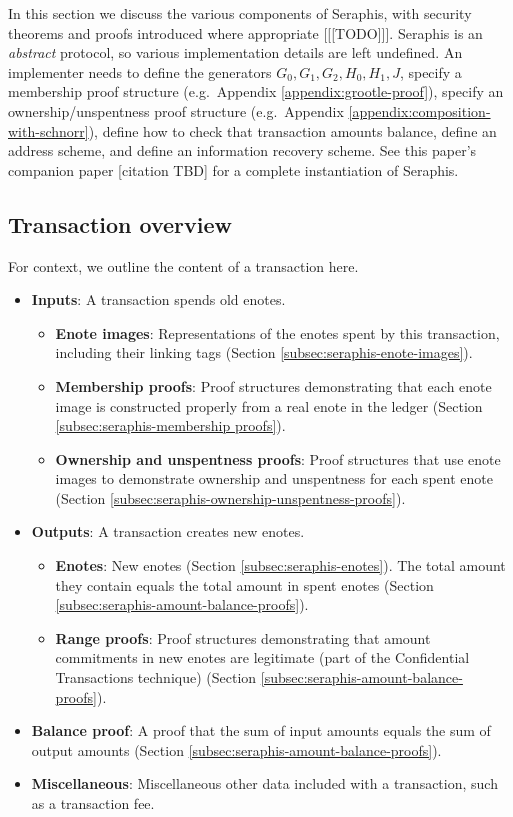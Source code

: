In this section we discuss the various components of Seraphis, with security theorems and proofs introduced where appropriate [[[TODO]]]. Seraphis is an {\em abstract} protocol, so various implementation details are left undefined. An implementer needs to define the generators $G_0, G_1, G_2, H_0, H_1, J$, specify a membership proof structure (e.g.\ Appendix \ref{appendix:grootle-proof}), specify an ownership/unspentness proof structure (e.g.\ Appendix \ref{appendix:composition-with-schnorr}), define how to check that transaction amounts balance, define an address scheme, and define an information recovery scheme. See this paper's companion paper [citation TBD] for a complete instantiation of Seraphis.


\subsection{Transaction overview}
\label{subsec:seraphis-transaction-overview}

For context, we outline the content of a transaction here.

\begin{itemize}
    \item \textbf{Inputs}: A transaction spends old enotes.
    \begin{itemize}
        \item \textbf{Enote images}: Representations of the enotes spent by this transaction, including their linking tags (Section \ref{subsec:seraphis-enote-images}).
        \item \textbf{Membership proofs}: Proof structures demonstrating that each enote image is constructed properly from a real enote in the ledger (Section \ref{subsec:seraphis-membership proofs}).
        \item \textbf{Ownership and unspentness proofs}: Proof structures that use enote images to demonstrate ownership and unspentness for each spent enote (Section \ref{subsec:seraphis-ownership-unspentness-proofs}).
    \end{itemize}
    \item \textbf{Outputs}: A transaction creates new enotes.
    \begin{itemize}
        \item \textbf{Enotes}: New enotes (Section \ref{subsec:seraphis-enotes}). The total amount they contain equals the total amount in spent enotes (Section \ref{subsec:seraphis-amount-balance-proofs}).
        \item \textbf{Range proofs}: Proof structures demonstrating that amount commitments in new enotes are legitimate (part of the Confidential Transactions technique) (Section \ref{subsec:seraphis-amount-balance-proofs}).
    \end{itemize}
    \item \textbf{Balance proof}: A proof that the sum of input amounts equals the sum of output amounts (Section \ref{subsec:seraphis-amount-balance-proofs}).
    \item \textbf{Miscellaneous}: Miscellaneous other data included with a transaction, such as a transaction fee.
\end{itemize}


